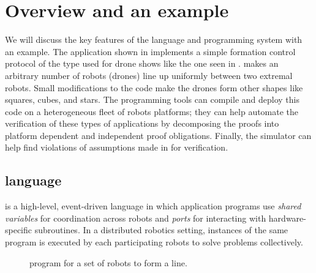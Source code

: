 \section{Overview and an example}
\label{sec:overview}

\newcommand{\Motion}{\emph{Motion}\xspace}

We will discuss the key features of the \lgname language and programming system with an example.
The \lgname application \LineForm shown in  implements a simple formation control protocol of the type  used for drone shows like the one seen in .
\LineForm makes an arbitrary number of robots (drones) line up uniformly between two extremal robots.
Small modifications to the code make the drones form other shapes like squares, cubes, and stars.
The \lgname programming tools can compile and deploy this code on a heterogeneous fleet of robots platforms; they can  help automate the verification of these types of applications by decomposing the proofs into platform dependent and independent proof obligations. Finally, the \lgname simulator can help find violations of assumptions made in for verification.

\subsection{\lgname language}
\label{sec:koord-language}
\lgname is a high-level, event-driven language in which application programs use \emph{shared variables} for coordination across robots
and \emph{ports} for interacting with hardware-specific subroutines.
In a distributed robotics setting, instances of the same \lgname program is executed by each participating robots to solve problems collectively.

\begin{figure}[h!]
    {
        
    }
    {
        
    }
    \caption{\lgname program \LineForm for a set of robots to form a line.}
    \label{fig:lineform}
\end{figure}

